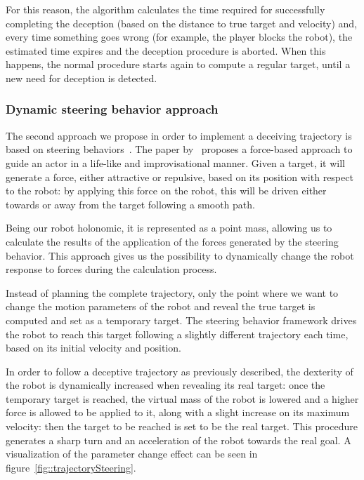 For this reason, the algorithm calculates the time required for successfully completing the deception (based on the distance to true target and velocity) and, every time something goes wrong (for example, the player blocks the robot), the estimated time expires and the deception procedure is aborted. When this happens, the normal procedure starts again to compute a regular target, until a new need for deception is detected.

\subsubsection{Dynamic steering behavior approach}
The second approach we propose in order to implement a deceiving trajectory is based on steering behaviors~\citep{reynolds_steering_1999}. The paper by~\cite{reynolds_steering_1999} proposes a force-based approach to guide an actor in a life-like and improvisational manner. Given a target, it will generate a force, either attractive or repulsive, based on its position with respect to the robot: by applying this force on the robot, this will be driven either towards or away from the target following a smooth path.

Being our robot holonomic, it is represented as a point mass, allowing us to calculate the results of the application of the forces generated by the steering behavior. This approach gives us the possibility to dynamically change the robot response to forces %
during the calculation process.

Instead of planning the complete trajectory, only the point where we want to change the motion parameters of the robot and reveal the true target is computed and set as a temporary target. The steering behavior framework drives the robot to reach this target following a slightly different trajectory each time, based on its initial velocity and position.

In order to follow a deceptive trajectory as previously described, the dexterity of the robot is dynamically increased when revealing its real target: once the temporary target is reached, the virtual mass of the robot is lowered and a higher force is allowed to be applied to it, along with a slight increase on its maximum velocity: then the target to be reached is set to be the real target. This procedure generates a sharp turn and an acceleration of the robot towards the real goal. A visualization of the parameter change effect can be seen in figure~\ref{fig::trajectorySteering}. %

